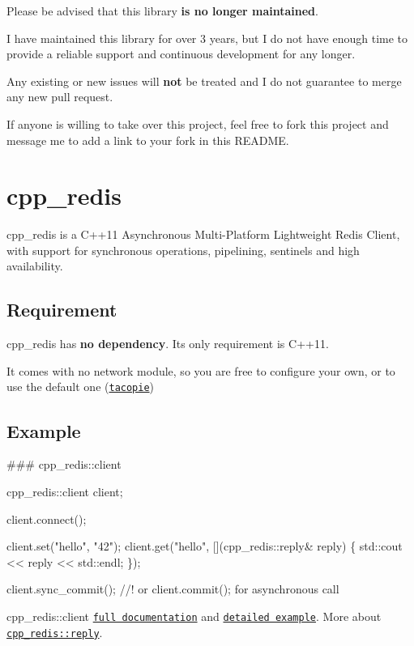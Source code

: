 Please be advised that this library {\bfseries is no longer maintained}.

I have maintained this library for over 3 years, but I do not have enough time to provide a reliable support and continuous development for any longer.

Any existing or new issues will {\bfseries not} be treated and I do not guarantee to merge any new pull request.

If anyone is willing to take over this project, feel free to fork this project and message me to add a link to your fork in this R\+E\+A\+D\+ME.

 

\section*{cpp\+\_\+redis \href{https://travis-ci.org/Cylix/cpp_redis}{\tt } \href{https://ci.appveyor.com/project/Cylix/cpp-redis}{\tt }}

{\ttfamily cpp\+\_\+redis} is a C++11 Asynchronous Multi-\/\+Platform Lightweight Redis Client, with support for synchronous operations, pipelining, sentinels and high availability.

\subsection*{Requirement}

{\ttfamily cpp\+\_\+redis} has {\bfseries no dependency}. Its only requirement is {\ttfamily C++11}.

It comes with no network module, so you are free to configure your own, or to use the default one (\href{https://github.com/cylix/tacopie}{\tt tacopie})

\subsection*{Example}

\#\#\# cpp\+\_\+redis\+::client 
\begin{DoxyCode}
cpp\_redis::client client;

client.connect();

client.set(\textcolor{stringliteral}{"hello"}, \textcolor{stringliteral}{"42"});
client.get(\textcolor{stringliteral}{"hello"}, [](cpp\_redis::reply& reply) \{
  std::cout << reply << std::endl;
\});

client.sync\_commit();
\textcolor{comment}{//! or client.commit(); for asynchronous call}
\end{DoxyCode}
 {\ttfamily cpp\+\_\+redis\+::client} \href{https://github.com/Cylix/cpp_redis/wiki/Redis-Client}{\tt full documentation} and \href{https://github.com/Cylix/cpp_redis/wiki/Examples#redis-client}{\tt detailed example}. More about \href{https://github.com/Cylix/cpp_redis/wiki/Replies}{\tt cpp\+\_\+redis\+::reply}.

